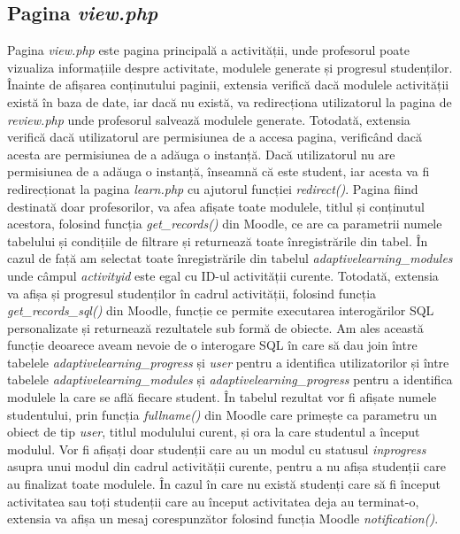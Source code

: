 \subsection{Pagina \textit{view.php}}
Pagina \textit{view.php} este pagina principală a activității, unde profesorul poate vizualiza informațiile despre activitate, modulele generate și progresul studenților. Înainte de afișarea 
conținutului paginii, extensia verifică dacă modulele activității există în baza de date, iar dacă nu există, va redirecționa utilizatorul la pagina de \textit{review.php} unde profesorul 
salvează modulele generate. Totodată, extensia verifică dacă utilizatorul are permisiunea de a accesa pagina, verificând dacă acesta are permisiunea de a adăuga o instanță. Dacă utilizatorul 
nu are permisiunea de a adăuga o instanță, înseamnă că este student, iar acesta va fi redirecționat la pagina \textit{learn.php} cu ajutorul funcției \textit{redirect()}. Pagina fiind 
destinată doar profesorilor, va afea afișate toate modulele, titlul și conținutul acestora, folosind funcția \textit{get\_records()} din Moodle, ce are ca parametrii numele tabelului și
condițiile de filtrare și returnează toate înregistrările din tabel. În cazul de față am selectat toate înregistrările din tabelul \textit{adaptivelearning\_modules} unde câmpul 
\textit{activityid} este egal cu ID-ul activității curente. Totodată, extensia va afișa și progresul studenților în cadrul activității, folosind funcția \textit{get\_records\_sql()} din 
Moodle, funcție ce permite executarea interogărilor SQL personalizate și returnează rezultatele sub formă de obiecte. Am ales această funcție deoarece aveam nevoie de o interogare SQL în 
care să dau join între tabelele \textit{adaptivelearning\_progress} și \textit{user} pentru a identifica utilizatorilor și între tabelele \textit{adaptivelearning\_modules} și
\textit{adaptivelearning\_progress} pentru a identifica modulele la care se află fiecare student. În tabelul rezultat vor fi afișate numele studentului, prin funcția \textit{fullname()} 
din Moodle care primește ca parametru un obiect de tip \textit{user}, titlul modulului curent, și ora la care studentul a început modulul. Vor fi afișați doar studenții care au un modul cu 
statusul \textit{inprogress} asupra unui modul din cadrul activității curente, pentru a nu afișa studenții care au finalizat toate modulele. În cazul în care nu există studenți care să fi 
început activitatea sau toți studenții care au început activitatea deja au terminat-o,  extensia va afișa un mesaj corespunzător folosind funcția Moodle \textit{notification()}.

